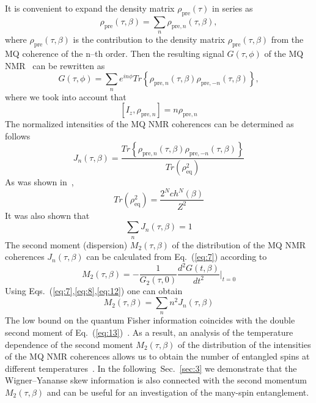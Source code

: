\documentclass[preprint,12pt]{elsarticle}
\begin{document}
It is convenient to expand the density matrix $\rho_\mathrm{pre}(\tau)$ in series as~\cite{21}
\begin{equation}
    \label{eq:6}
        \rho_\mathrm{pre}(\tau,\beta) = \sum_n \rho_{\mathrm{pre},n}(\tau,\beta),
\end{equation}
where $\rho_\mathrm{pre}(\tau,\beta)$ is the contribution to the density matrix $\rho_\mathrm{pre}(\tau,\beta)$ from the MQ coherence of the n--th order.
Then the resulting signal $G(\tau,\phi)$ of the MQ NMR~\cite{10} can be rewritten as
\begin{equation} \label{eq:7}
    G(\tau, \phi) = \sum_n e^{in\phi}
        Tr\left\{\rho_{\mathrm{pre},n}(\tau,\beta)
        \rho_{\mathrm{pre},-n}(\tau,\beta) \right\},
\end{equation}
where we took into account that
\begin{equation}
    \label{eq:8}
        [I_z, \rho_{\mathrm{pre},n}] = n \rho_{\mathrm{pre},n}
\end{equation}
The normalized intensities of the MQ NMR coherences can be determined as follows
\begin{equation}
    \label{eq:9}
        J_n(\tau,\beta)= \frac{Tr\left\{\rho_{\mathrm{pre},n}(\tau,\beta)
            \rho_{\mathrm{pre},-n}(\tau,\beta)\right\}}
                {Tr(\rho^2_\mathrm{eq})}
\end{equation}
As was shown in~\cite{8},
\begin{equation}
    \label{eq:10}
        Tr(\rho_\mathrm{eq}^2) = \frac{2^N ch^N (\beta)}{Z^2}
\end{equation}
It was also shown that
\begin{equation}
    \label{eq:11}
        \sum_n J_n(\tau,\beta) = 1
\end{equation}
The second moment (dispersion) $M_2(\tau,\beta)$ of the distribution of the MQ NMR coherences $J_n (\tau,\beta)$ can be calculated from Eq.~(\ref{eq:7}) according to~\cite{22}
\begin{equation}
    \label{eq:12}
        M_2(\tau,\beta) = -\frac{1}{G_2(\tau,0)}
            \frac{d^2 G(t,\beta)}{dt^2}\bigg|
        _{t=0}
\end{equation}
Using Eqs.~(\ref{eq:7},\ref{eq:8},\ref{eq:12}) one can obtain
\begin{equation}
    \label{eq:13}
        M_2 (\tau,\beta) = \sum_n n^2 J_n(\tau,\beta)
\end{equation}
The low bound on the quantum Fisher information coincides with the double second moment of Eq.~(\ref{eq:13})~\cite{7,9}.
As a result, an analysis of the temperature dependence of the second moment $M_2(\tau,\beta)$ of the distribution of the intensities of the MQ NMR coherences allows us to obtain the number of entangled spins at different temperatures~\cite{8}.
In the following~Sec.~\ref{sec:3} we demonstrate that the Wigner--Yananse skew information is also connected with the second momentum $M_2(\tau,\beta)$
and can be useful for an investigation of the many-spin entanglement.
\end{document}
